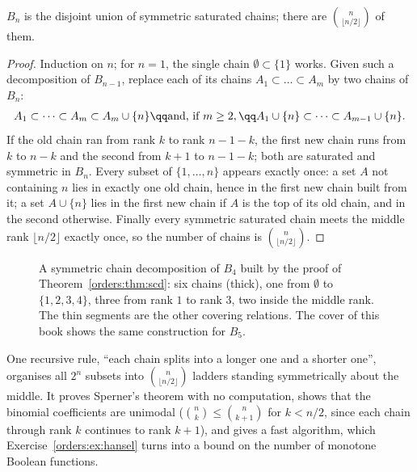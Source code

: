 \begin{theorem}\label{orders:thm:scd}
$B_n$ is the disjoint union of symmetric saturated chains; there are $\binom n{\lfloor n/2\rfloor}$ of them.
\end{theorem}
\begin{proof}
Induction on $n$; for $n=1$, the single chain $\emptyset\subset\{1\}$ works. Given such a decomposition of $B_{n-1}$, replace each of its chains
$A_1\subset\dots\subset A_m$ by two chains of $B_n$:
\[
\begin{gathered}A_1\subset\dots\subset A_m\subset A_m\cup\{n\}\qq\text{and, if }m\ge2,\qq A_1\cup\{n\}\subset\dots\subset A_{m-1}\cup\{n\}.\end{gathered}
\]
If the old chain ran from rank $k$ to rank $n-1-k$, the first new chain runs from $k$ to $n-k$ and the second from $k+1$ to $n-1-k$; both are
saturated and symmetric in $B_n$. Every subset of $\{1,\dots,n\}$ appears exactly once: a set $A$ not containing $n$ lies in exactly one old chain,
hence in the first new chain built from it; a set $A\cup\{n\}$ lies in the first new chain if $A$ is the top of its old chain, and in the
second otherwise. Finally every symmetric saturated chain meets the middle rank $\lfloor n/2\rfloor$ exactly once, so the number of chains is
$\binom n{\lfloor n/2\rfloor}$.
\end{proof}

\begin{figure}[ht]
\centering
{}
\caption{A symmetric chain decomposition of $B_4$ built by the proof of Theorem~\ref{orders:thm:scd}: six chains (thick), one from $\emptyset$ to
$\{1,2,3,4\}$, three from rank $1$ to rank $3$, two inside the middle rank. The thin segments are the other covering
relations. The cover of this book shows the same construction for $B_5$.}
\label{orders:fig:scd}
\end{figure}

\begin{beauty}
One recursive rule, ``each chain splits into a longer one and a shorter one'', organises all $2^n$ subsets into
$\binom n{\lfloor n/2\rfloor}$ ladders standing symmetrically about the middle. It proves Sperner's theorem with no computation, shows that the
binomial coefficients are unimodal ($\binom nk\le\binom n{k+1}$ for $k<n/2$, since each chain through rank $k$ continues to rank $k+1$), and gives a
fast algorithm, which Exercise~\ref{orders:ex:hansel} turns into a bound on the number of monotone Boolean functions.
\end{beauty}

